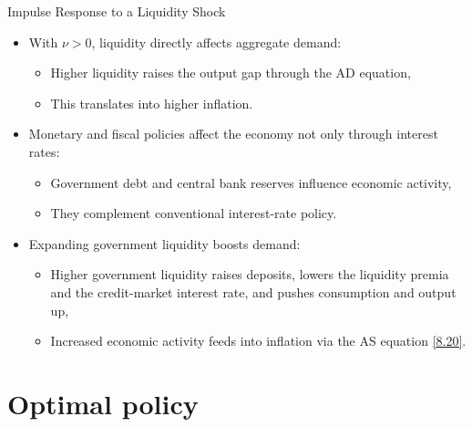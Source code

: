 \documentclass[11pt,aspectratio=169]{beamer}
\begin{document}
\begin{frame}{Impulse Response to a Liquidity Shock} 

\begin{itemize}
  \item With $\nu>0$, liquidity directly affects aggregate demand:
  \begin{itemize}
    \item Higher liquidity raises the output gap through the AD equation,
    \item This translates into higher inflation.
  \end{itemize}
\vspace{1em}
  \item Monetary and fiscal policies affect the economy not only through interest rates:
 
 \begin{itemize}
    \item Government debt and central bank reserves influence economic activity,
    \item They complement conventional interest-rate policy.
  \end{itemize}
\vspace{1em}
  \item Expanding government liquidity boosts demand:
  \begin{itemize}
    \item Higher government liquidity raises deposits, lowers the liquidity premia and the credit-market interest rate, and pushes consumption and output up,
    \item Increased economic activity feeds into inflation via the AS equation \eqref{8.20}.
  \end{itemize}
\end{itemize}

\end{frame}

\section{Optimal policy}
\end{document}
